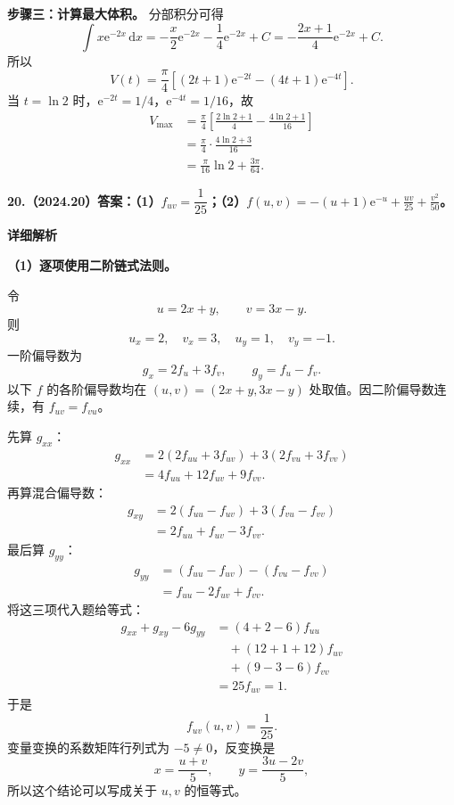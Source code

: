 \documentclass[UTF8,11pt,fontset=windows]{ctexart}
\begin{document}
\textbf{步骤三：计算最大体积。} 分部积分可得
$$
\int x\mathrm e^{-2x}\,\mathrm dx
=-\frac x2\mathrm e^{-2x}-\frac14\mathrm e^{-2x}+C
=-\frac{2x+1}{4}\mathrm e^{-2x}+C.
$$
所以
$$
V(t)=\frac\pi4\left[(2t+1)\mathrm e^{-2t}
-(4t+1)\mathrm e^{-4t}\right].
$$
当 $t=\ln2$ 时，$\mathrm e^{-2t}=1/4$，$\mathrm e^{-4t}=1/16$，故
$$
\begin{aligned}
V_{\max}
&=\frac\pi4\left[\frac{2\ln2+1}{4}
-\frac{4\ln2+1}{16}\right]\\
&=\frac\pi4\cdot\frac{4\ln2+3}{16}\\
&=\boxed{\frac\pi{16}\ln2+\frac{3\pi}{64}}.
\end{aligned}
$$

\clearpage

\textbf{20.（2024.20）答案：（1）$f_{uv}=\dfrac1{25}$；（2）$\displaystyle f(u,v)=-(u+1)\mathrm e^{-u}+\frac{uv}{25}+\frac{v^2}{50}$。}

\textbf{详细解析}

\textbf{（1）逐项使用二阶链式法则。}

令
$$
u=2x+y,\qquad v=3x-y.
$$
则
$$
u_x=2,\quad v_x=3,\quad u_y=1,\quad v_y=-1.
$$
一阶偏导数为
$$
g_x=2f_u+3f_v,
\qquad g_y=f_u-f_v.
$$
以下 $f$ 的各阶偏导数均在 $(u,v)=(2x+y,3x-y)$ 处取值。因二阶偏导数连续，有 $f_{uv}=f_{vu}$。

先算 $g_{xx}$：
$$
\begin{aligned}
g_{xx}
&=2(2f_{uu}+3f_{uv})
+3(2f_{vu}+3f_{vv})\\
&=4f_{uu}+12f_{uv}+9f_{vv}.
\end{aligned}
$$
再算混合偏导数：
$$
\begin{aligned}
g_{xy}
&=2(f_{uu}-f_{uv})
+3(f_{vu}-f_{vv})\\
&=2f_{uu}+f_{uv}-3f_{vv}.
\end{aligned}
$$
最后算 $g_{yy}$：
$$
\begin{aligned}
g_{yy}
&=(f_{uu}-f_{uv})-(f_{vu}-f_{vv})\\
&=f_{uu}-2f_{uv}+f_{vv}.
\end{aligned}
$$
将这三项代入题给等式：
$$
\begin{aligned}
g_{xx}+g_{xy}-6g_{yy}
&=(4+2-6)f_{uu}\\
&\quad +(12+1+12)f_{uv}\\
&\quad +(9-3-6)f_{vv}\\
&=25f_{uv}=1.
\end{aligned}
$$
于是
$$
\boxed{f_{uv}(u,v)=\frac1{25}}.
$$
变量变换的系数矩阵行列式为 $-5\ne0$，反变换是
$$
x=\frac{u+v}{5},\qquad y=\frac{3u-2v}{5},
$$
所以这个结论可以写成关于 $u,v$ 的恒等式。
\end{document}
